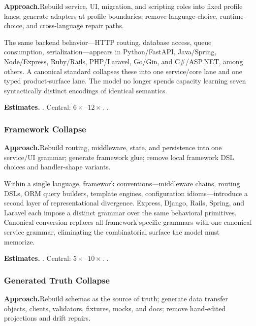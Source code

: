 \smallskip\noindent
\textbf{Approach.}\quad Rebuild service, UI, migration, and scripting roles into fixed profile lanes; generate adapters at profile boundaries; remove language-choice, runtime-choice, and cross-language repair paths.

The same backend behavior---HTTP routing, database access, queue
consumption, serialization---appears in Python/FastAPI, Java/Spring,
Node/Express, Ruby/Rails, PHP/Laravel, Go/Gin, and C\#/ASP.NET, among
others.  A canonical standard collapses these into one service/core lane
and one typed product-surface lane.  The model no longer spends capacity
learning seven syntactically distinct encodings of identical semantics.

\smallskip\noindent
\textbf{Estimates.}\quad
{}.\quad
Central: $6\times$--$12\times$.\quad
{}.

\subsubsection{Framework Collapse}
\label{ssec:framework-collapse}

\smallskip\noindent
\textbf{Approach.}\quad Rebuild routing, middleware, state, and persistence into one service/UI grammar; generate framework glue; remove local framework DSL choices and handler-shape variants.

Within a single language, framework conventions---middleware chains,
routing DSLs, ORM query builders, template engines, configuration
idioms---introduce a second layer of representational divergence.
Express, Django, Rails, Spring, and Laravel each impose a distinct
grammar over the same behavioral primitives.  Canonical conversion
replaces all framework-specific grammars with one canonical service
grammar, eliminating the combinatorial surface the model must memorize.

\smallskip\noindent
\textbf{Estimates.}\quad
{}.\quad
Central: $5\times$--$10\times$.\quad
{}.

\subsubsection{Generated Truth Collapse}
\label{ssec:generated-truth}

\smallskip\noindent
\textbf{Approach.}\quad Rebuild schemas as the source of truth; generate data transfer objects, clients, validators, fixtures, mocks, and docs; remove hand-edited projections and drift repairs.


